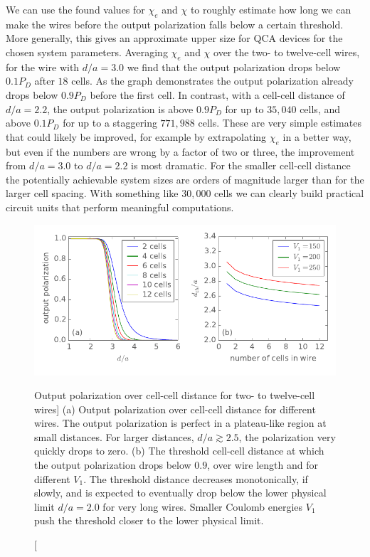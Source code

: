 We can use the found values for $\chi_e$ and $\chi$ to roughly estimate how long
we can make the wires before the output polarization falls below a certain
threshold. More generally, this gives an approximate upper size for QCA devices
for the chosen system parameters. Averaging $\chi_e$ and $\chi$ over the two- to
twelve-cell wires, for the wire with $d/a = 3.0$ we find that the output
polarization drops below $0.1 P_D$ after $18$ cells. As the graph demonstrates the
output polarization already drops below $0.9 P_D$ before the first cell. In
contrast, with a cell-cell distance of $d/a = 2.2$, the output polarization is
above $0.9 P_D$ for up to $35,040$ cells, and above $0.1 P_D$ for up to a
staggering $771,988$ cells. These are very simple estimates that could likely be
improved, for example by extrapolating $\chi_e$ in a better way, but even if the
numbers are wrong by a factor of two or three, the improvement from $d/a = 3.0$
to $d/a = 2.2$ is most dramatic. For the smaller cell-cell distance the
potentially achievable system sizes are orders of magnitude larger than for the
larger cell spacing. With something like $30,000$ cells we can clearly build
practical circuit units that perform meaningful computations.

\begin{figure}
  \center
  \includegraphics{cell_cell_distance_threshold}
  \caption
  [Output polarization over cell-cell distance for two- to twelve-cell wires]
  {
  (a) Output polarization over cell-cell distance for different wires. The
  output polarization is perfect in a plateau-like region at small distances.
  For larger distances, $d/a \gtrsim 2.5$, the polarization very quickly drops
  to zero.
  (b) The threshold cell-cell distance at which the output polarization drops
  below $0.9$, over wire length and for different $V_1$. The threshold distance
  decreases monotonically, if slowly, and is expected to eventually drop below
  the lower physical limit $d/a = 2.0$ for very long wires. Smaller Coulomb
  energies $V_1$ push the threshold closer to the lower physical limit.
  }
  \label{fig:cell_cell_distance_threshold}
\end{figure}

